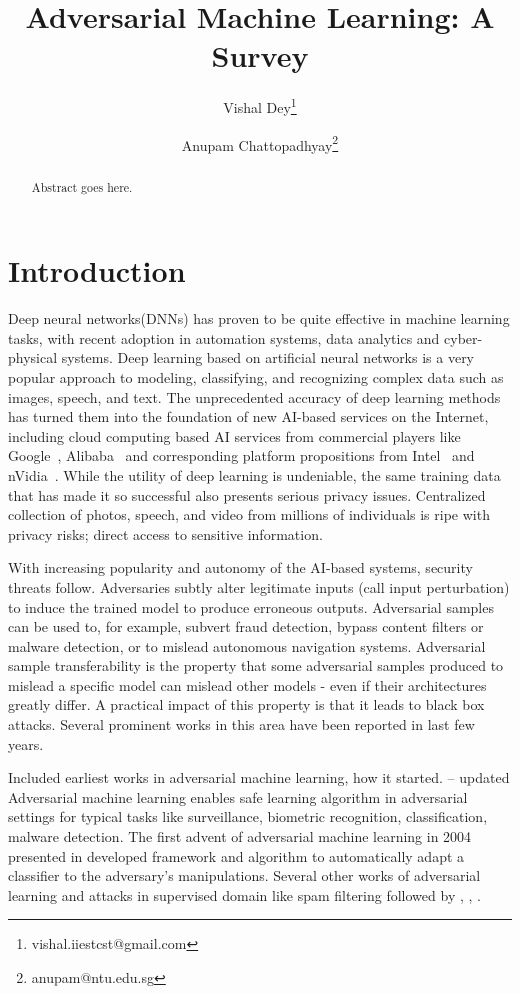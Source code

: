 \documentclass[a4paper]{article}
\title{Adversarial Machine Learning: A Survey}
\author[1]{Vishal Dey\thanks{vishal.iiestcst@gmail.com}}
\author[2]{Anupam Chattopadhyay\thanks{anupam@ntu.edu.sg}}
\affil[1]{Department of Computer Science and Technology,  Indian Institute of Engineering Science and Technology, Shibpur}
\affil[2]{School of Computer Science and Engineering, Nanyang Technological University, Singapore}
\newcommand{\ach}[1]{{\color{red}#1}}
\begin{document}
\maketitle

\begin{abstract}
Abstract goes here.
\end{abstract}

\section{Introduction}
Deep neural networks(DNNs) has proven to be quite effective in machine learning tasks, with recent adoption in automation systems, data analytics and cyber-physical systems. Deep learning based on artificial neural networks is a very popular approach to modeling, classifying, and recognizing complex data such as images, speech, and text. The unprecedented accuracy of deep learning methods has turned them into the foundation of new AI-based services on the Internet, including cloud computing based AI services from commercial players like Google~\cite{google_cloud}, Alibaba~\cite{alibaba_cloud} and corresponding platform propositions from Intel~\cite{intel_cloud} and nVidia~\cite{nvidia_cloud}. While the utility of deep learning is undeniable, the same training data that has made it so successful also presents serious privacy issues. Centralized collection of photos, speech, and video from millions of individuals is ripe with privacy risks; direct access to sensitive information.

With increasing popularity and autonomy of the AI-based systems, security threats follow. Adversaries subtly alter legitimate inputs (call input perturbation) to induce the trained model to produce erroneous outputs. Adversarial samples can be used to, for example, subvert fraud detection, bypass content filters or malware detection, or to mislead autonomous navigation systems. Adversarial sample transferability is the property that some adversarial samples produced to mislead a specific model can mislead other models - even if their architectures greatly differ. A practical impact of this property is that it leads to black box attacks. Several prominent works in this area have been reported in last few years. 

\ach{Included earliest works in adversarial machine learning, how it started. -- updated}
Adversarial machine learning enables safe learning algorithm in adversarial settings for typical tasks like surveillance, biometric recognition, classification, malware detection. The first advent of adversarial machine learning in 2004 presented in \cite{dalvi2004adversarial} developed framework and algorithm to automatically adapt a classifier to the adversary's manipulations. Several other works of adversarial learning and attacks in supervised domain like spam filtering followed by \cite{lowd2005adversarial}, \cite{biggio2008adversarial}, \cite{biggio2014security}.
\end{document}
